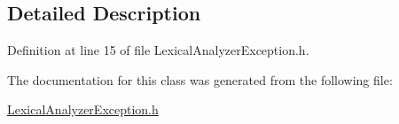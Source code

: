 \subsection{Detailed Description}


Definition at line 15 of file Lexical\+Analyzer\+Exception.\+h.



The documentation for this class was generated from the following file\+:\begin{DoxyCompactItemize}
\item 
\hyperlink{_lexical_analyzer_exception_8h}{Lexical\+Analyzer\+Exception.\+h}\end{DoxyCompactItemize}
